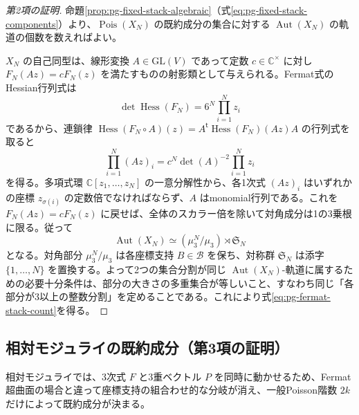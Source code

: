 \begin{proof}[第2項の証明]
命題\ref{prop:pg-fixed-stack-algebraic}（式\eqref{eq:pg-fixed-stack-components}）より、$\operatorname{Pois}(X_N)$ の既約成分の集合に対する $\operatorname{Aut}(X_N)$ の軌道の個数を数えればよい。

$X_N$ の自己同型は、線形変換 $A\in\mathrm{GL}(V)$ であって定数 $c\in\mathbb C^\times$ に対し $F_N(Az)=cF_N(z)$ を満たすものの射影類として与えられる。Fermat式のHessian行列式は
\begin{equation}\label{eq:pg-fermat-hessian-discriminant}
 \det\operatorname{Hess}(F_N)=6^N\prod_{i=1}^N z_i
\end{equation}
であるから、連鎖律 $\operatorname{Hess}(F_N\circ A)(z)=A^{\mathsf t}\operatorname{Hess}(F_N)(Az)A$ の行列式を取ると
\begin{equation}\label{eq:pg-fermat-hessian-transform}
 \prod_{i=1}^N(Az)_i=c^N\det(A)^{-2}\prod_{i=1}^N z_i
\end{equation}
を得る。多項式環 $\mathbb C[z_1,\ldots,z_N]$ の一意分解性から、各1次式 $(Az)_i$ はいずれかの座標 $z_{\sigma(i)}$ の定数倍でなければならず、$A$ はmonomial行列である。これを $F_N(Az)=cF_N(z)$ に戻せば、全体のスカラー倍を除いて対角成分は1の3乗根に限る。従って
\begin{equation}\label{eq:pg-fermat-automorphism-group}
 \operatorname{Aut}(X_N)\simeq(\mu_3^N/\mu_3)\rtimes\mathfrak S_N
\end{equation}
となる。対角部分 $\mu_3^N/\mu_3$ は各座標支持 $B\in\mathcal B$ を保ち、対称群 $\mathfrak S_N$ は添字 $\{1,\ldots,N\}$ を置換する。よって2つの集合分割が同じ $\operatorname{Aut}(X_N)$-軌道に属するための必要十分条件は、部分の大きさの多重集合が等しいこと、すなわち同じ「各部分が3以上の整数分割」を定めることである。これにより式\eqref{eq:pg-fermat-stack-count}を得る。
\end{proof}

\subsection{相対モジュライの既約成分（第3項の証明）}
相対モジュライでは、3次式 $F$ と3重ベクトル $P$ を同時に動かせるため、Fermat超曲面の場合と違って座標支持の組合わせ的な分岐が消え、一般Poisson階数 $2k$ だけによって既約成分が決まる。

